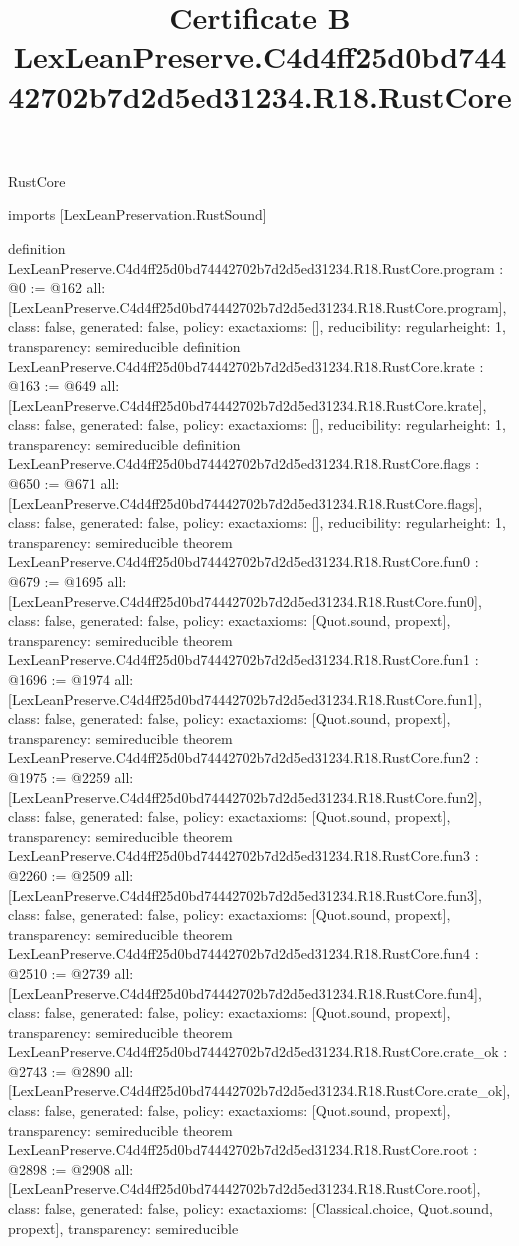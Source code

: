 \begin{lexlean}{RustCore}
\title{Certificate B LexLeanPreserve.C4d4ff25d0bd74442702b7d2d5ed31234.R18.RustCore}
\begin{coremodule}
imports [LexLeanPreservation.RustSound]

definition LexLeanPreserve.C4d4ff25d0bd74442702b7d2d5ed31234.R18.RustCore.program : @0 := @162 {
  all: [LexLeanPreserve.C4d4ff25d0bd74442702b7d2d5ed31234.R18.RustCore.program],
  class: false,
  generated: false,
  policy: exact{axioms: []},
  reducibility: regular{height: 1},
  transparency: semireducible
}
definition LexLeanPreserve.C4d4ff25d0bd74442702b7d2d5ed31234.R18.RustCore.krate : @163 := @649 {
  all: [LexLeanPreserve.C4d4ff25d0bd74442702b7d2d5ed31234.R18.RustCore.krate],
  class: false,
  generated: false,
  policy: exact{axioms: []},
  reducibility: regular{height: 1},
  transparency: semireducible
}
definition LexLeanPreserve.C4d4ff25d0bd74442702b7d2d5ed31234.R18.RustCore.flags : @650 := @671 {
  all: [LexLeanPreserve.C4d4ff25d0bd74442702b7d2d5ed31234.R18.RustCore.flags],
  class: false,
  generated: false,
  policy: exact{axioms: []},
  reducibility: regular{height: 1},
  transparency: semireducible
}
theorem LexLeanPreserve.C4d4ff25d0bd74442702b7d2d5ed31234.R18.RustCore.fun0 : @679 := @1695 {
  all: [LexLeanPreserve.C4d4ff25d0bd74442702b7d2d5ed31234.R18.RustCore.fun0],
  class: false,
  generated: false,
  policy: exact{axioms: [Quot.sound, propext]},
  transparency: semireducible
}
theorem LexLeanPreserve.C4d4ff25d0bd74442702b7d2d5ed31234.R18.RustCore.fun1 : @1696 := @1974 {
  all: [LexLeanPreserve.C4d4ff25d0bd74442702b7d2d5ed31234.R18.RustCore.fun1],
  class: false,
  generated: false,
  policy: exact{axioms: [Quot.sound, propext]},
  transparency: semireducible
}
theorem LexLeanPreserve.C4d4ff25d0bd74442702b7d2d5ed31234.R18.RustCore.fun2 : @1975 := @2259 {
  all: [LexLeanPreserve.C4d4ff25d0bd74442702b7d2d5ed31234.R18.RustCore.fun2],
  class: false,
  generated: false,
  policy: exact{axioms: [Quot.sound, propext]},
  transparency: semireducible
}
theorem LexLeanPreserve.C4d4ff25d0bd74442702b7d2d5ed31234.R18.RustCore.fun3 : @2260 := @2509 {
  all: [LexLeanPreserve.C4d4ff25d0bd74442702b7d2d5ed31234.R18.RustCore.fun3],
  class: false,
  generated: false,
  policy: exact{axioms: [Quot.sound, propext]},
  transparency: semireducible
}
theorem LexLeanPreserve.C4d4ff25d0bd74442702b7d2d5ed31234.R18.RustCore.fun4 : @2510 := @2739 {
  all: [LexLeanPreserve.C4d4ff25d0bd74442702b7d2d5ed31234.R18.RustCore.fun4],
  class: false,
  generated: false,
  policy: exact{axioms: [Quot.sound, propext]},
  transparency: semireducible
}
theorem LexLeanPreserve.C4d4ff25d0bd74442702b7d2d5ed31234.R18.RustCore.crate_ok : @2743 := @2890 {
  all: [LexLeanPreserve.C4d4ff25d0bd74442702b7d2d5ed31234.R18.RustCore.crate_ok],
  class: false,
  generated: false,
  policy: exact{axioms: [Quot.sound, propext]},
  transparency: semireducible
}
theorem LexLeanPreserve.C4d4ff25d0bd74442702b7d2d5ed31234.R18.RustCore.root : @2898 := @2908 {
  all: [LexLeanPreserve.C4d4ff25d0bd74442702b7d2d5ed31234.R18.RustCore.root],
  class: false,
  generated: false,
  policy: exact{axioms: [Classical.choice, Quot.sound, propext]},
  transparency: semireducible
}


\end{coremodule}
\end{lexlean}
